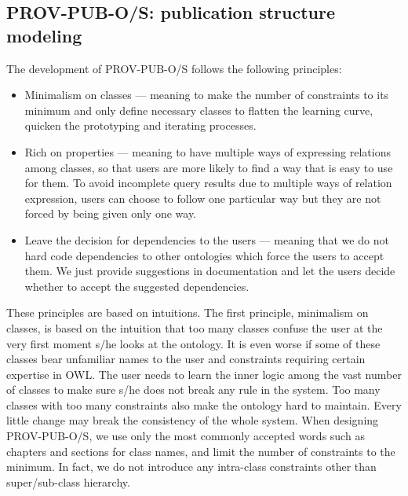 \subsection{PROV-PUB-O/S: publication structure modeling}
\label{subsec:structure}

The development of PROV-PUB-O/S follows the following principles:
\begin{itemize}
	\item Minimalism on classes --- meaning to make the number of constraints to its minimum and only define necessary classes to flatten the learning curve, quicken the prototyping and iterating processes.
	\item Rich on properties --- meaning to have multiple ways of expressing relations among classes, so that users are more likely to find a way that is easy to use for them. To avoid incomplete query results due to multiple ways of relation expression, users can choose to follow one particular way but they are not forced by being given only one way.
	\item Leave the decision for dependencies to the users --- meaning that we do not hard code dependencies to other ontologies which force the users to accept them. We just provide suggestions in documentation and let the users decide whether to accept the suggested dependencies.
\end{itemize}

These principles are based on intuitions. The first principle, minimalism on classes, is based on the intuition that too many classes confuse the user at the very first moment s/he looks at the ontology. It is even worse if some of these classes bear unfamiliar names to the user and constraints requiring certain expertise in OWL. The user needs to learn the inner logic among the vast number of classes to make sure s/he does not break any rule in the system. Too many classes with too many constraints also make the ontology hard to maintain. Every little change may break the consistency of the whole system. When designing PROV-PUB-O/S, we use only the most commonly accepted words such as chapters and sections for class names, and limit the number of constraints to the minimum. In fact, we do not introduce any intra-class constraints other than super/sub-class hierarchy.

